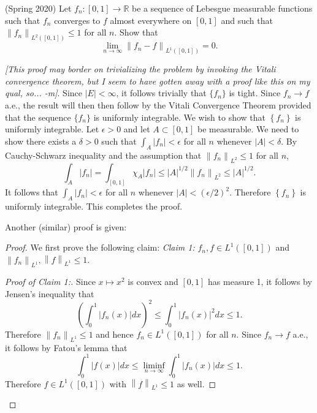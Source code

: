 \documentclass{exam}
\theoremstyle{problemstyle}
\newcommand{\vt}{\vskip 5mm} %
\newcommand{\norm}[1]{\left\lVert#1\right\rVert} %
\newcommand{\1}[1]{\textbf{1}_{\left[#1\right]}} %
\def\limn{\lim_{n\to\infty}} %
\def\R{\mathbb{R}} %
\begin{document}
\begin{questions}
\question (Spring 2020)
  Let $f_{n}:[0,1]\to \R$ be a sequence of Lebesgue measurable functions such that $f_{n}$ converges to $f$ almost everywhere on $[0,1]$ and such that $\norm{f_{n}}_{L^{2}([0,1])}\leq 1$ for all $n$. Show that
  \begin{equation*}
    \limn \norm{f_{n}-f}_{L^{1}([0,1])}=0.
  \end{equation*}

\begin{solution}
  
  \textit{[This proof may border on trivializing the problem by invoking the Vitali convergence theorem, but I seem to have gotten away with a proof like this on my qual, so... -m]}. Since $|E|<\infty$, it follows trivially that $\{f_{n}\}$ is tight. Since $f_{n}\to f$ a.e., the result will then then follow by the Vitali Convergence Theorem provided that the sequence $\{f_{n}\}$ is uniformly integrable.
  We wish to show that $\left\{ f_{n} \right\}$ is uniformly integrable. Let $\epsilon>0$ and let $A\subset [0,1]$ be measurable. We need to show there exists a $\delta>0$ such that $\int_{A}|f_{n}| <\epsilon$ for all $n$ whenever $|A|<\delta$. By Cauchy-Schwarz inequality and the assumption that $\norm{f_{n}}_{L^{2}}\leq 1$ for all $n$,
  \begin{equation*}
    \int_{A}|f_{n}| = \int_{[0,1]}\chi_{A}|f_{n}| \leq |A|^{1/2}\norm{f_{n}}_{L^{2}} \leq |A|^{1/2}.
  \end{equation*}
  It follows that $\int_{A}|f_{n}|<\epsilon $ for all $n$ whenever $|A|<(\epsilon/2)^{2}$. Therefore $\left\{ f_{n} \right\}$ is uniformly integrable. This completes the proof.


Another (similar) proof is given:
\begin{proof}

  We first prove the following claim:
  \vt
  \noindent
  \textit{Claim 1:} $f_{n},f\in L^{1}([0,1])$ and $\norm{f_{n}}_{L^{1}},\norm{f}_{L^{1}}\leq 1$.
  \begin{proof}[Proof of Claim 1:]
    Since $x\mapsto x^{2}$ is convex and $[0,1]$ has measure 1, it follows by Jensen's inequality that
    \begin{equation*}
      \left(\int_{0}^{1}|f_{n}(x)|dx\right)^{2}\leq \int_{0}^{1}|f_{n}(x)|^{2}dx\leq 1.
    \end{equation*}
    Therefore $\norm{f_{n}}_{L^{1}}\leq 1$ and hence $f_{n}\in L^{1}([0,1])$ for all $n$. Since $f_{n}\to f$ a.e., it follows by Fatou's lemma that
    \begin{equation*}
      \int_{0}^{1}|f(x)|dx \leq \liminf_{n\to\infty}\int_{0}^{1}|f_{n}(x)|dx \leq 1.
    \end{equation*}
    Therefore $f\in L^{1}([0,1])$ with $\norm{f}_{L^{1}}\leq 1$  as well.
  \end{proof}




\end{proof}
\end{solution}
\end{questions}
\end{document}
